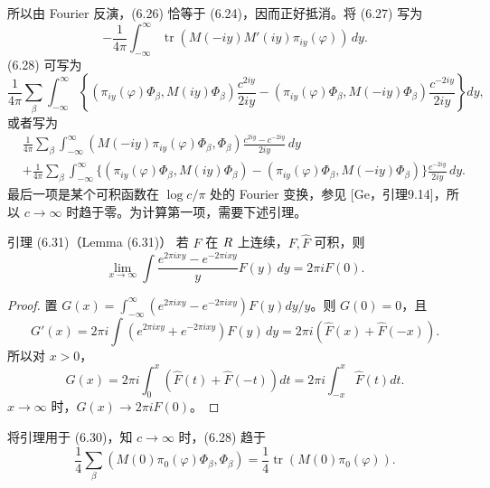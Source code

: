 所以由 Fourier 反演，(6.26) 恰等于 (6.24)，因而正好抵消。将 (6.27) 写为
\begin{equation}
 -\frac1{4\pi}\int_{-\infty}^{\infty}
 \operatorname{tr}(M(-iy)M'(iy)\pi_{iy}(\varphi))\,dy.\tag{6.29}
\end{equation}
(6.28) 可写为
\[
 \frac1{4\pi}\sum_\beta\int_{-\infty}^{\infty}
 \left\{(\pi_{iy}(\varphi)\Phi_\beta,M(iy)\Phi_\beta)\frac{c^{2iy}}{2iy}
 -(\pi_{iy}(\varphi)\Phi_\beta,M(-iy)\Phi_\beta)\frac{c^{-2iy}}{2iy}\right\}dy,
\]
或者写为
\begin{equation}
\begin{split}
 &\frac1{4\pi}\sum_\beta\int_{-\infty}^{\infty}
 (M(-iy)\pi_{iy}(\varphi)\Phi_\beta,\Phi_\beta)
 \frac{c^{2iy}-c^{-2iy}}{2iy}\,dy\\
 &+\frac1{4\pi}\sum_\beta\int_{-\infty}^{\infty}
 \{(\pi_{iy}(\varphi)\Phi_\beta,M(iy)\Phi_\beta)
 -(\pi_{iy}(\varphi)\Phi_\beta,M(-iy)\Phi_\beta)\}
 \frac{c^{-2iy}}{2iy}\,dy.
\end{split}\tag{6.30}
\end{equation}
最后一项是某个可积函数在 $\log c/\pi$ 处的 Fourier 变换，参见 [Ge，引理9.14]，所以
$c\to\infty$ 时趋于零。为计算第一项，需要下述引理。

\begin{originaltheorem}{引理 (6.31)（Lemma (6.31)）}
若 $F$ 在 $R$ 上连续，$F,\widehat F$ 可积，则
\[
 \lim_{x\to\infty}\int\frac{e^{2\pi ixy}-e^{-2\pi ixy}}yF(y)\,dy=2\pi iF(0).
\]
\end{originaltheorem}
\begin{proof}
置 $G(x)=\int_{-\infty}^{\infty}(e^{2\pi ixy}-e^{-2\pi ixy})F(y)dy/y$。则 $G(0)=0$，且
\[
 G'(x)=2\pi i\int(e^{2\pi ixy}+e^{-2\pi ixy})F(y)\,dy
 =2\pi i(\widehat F(x)+\widehat F(-x)).
\]
所以对 $x>0$，
\[
 G(x)=2\pi i\int_0^x(\widehat F(t)+\widehat F(-t))dt
 =2\pi i\int_{-x}^x\widehat F(t)dt.
\]
$x\to\infty$ 时，$G(x)\to2\pi iF(0)$。
\end{proof}
将引理用于 (6.30)，知 $c\to\infty$ 时，(6.28) 趋于
\begin{equation}
 \frac14\sum_\beta(M(0)\pi_0(\varphi)\Phi_\beta,\Phi_\beta)
 =\frac14\operatorname{tr}(M(0)\pi_0(\varphi)).\tag{6.32}
\end{equation}

